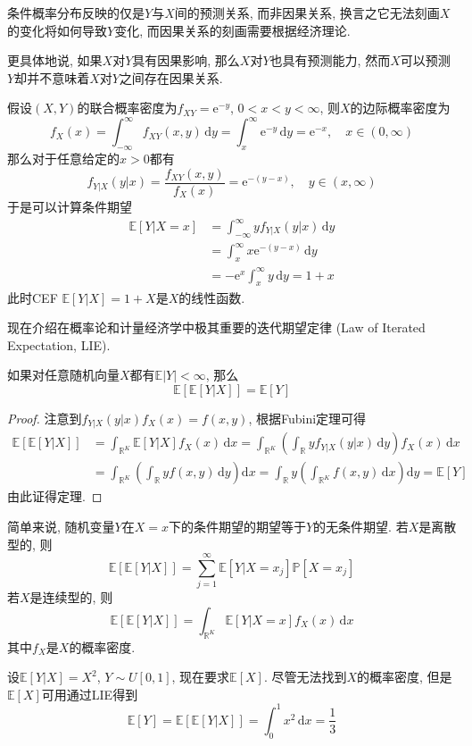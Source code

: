 \documentclass[cn, 12pt, math=mtpro2, bibstyle=apa, blue, twocol]{elegantbook}
\newcommand{\R}{\mathbb{R}}
\newcommand{\E}{\mathbb{E}}
\newcommand{\PP}{\mathbb{P}}
\begin{document}
\begin{remark}
条件概率分布反映的仅是$Y$与$X$间的预测关系, 而非因果关系, 换言之它无法刻画$X$的变化将如何导致$Y$变化, 而因果关系的刻画需要根据经济理论.

更具体地说, 如果$X$对$Y$具有因果影响, 那么$X$对$Y$也具有预测能力, 然而$X$可以预测$Y$却并不意味着$X$对$Y$之间存在因果关系.
\end{remark}
\begin{example}
假设$(X,Y)$的联合概率密度为$f_{XY}=\text{e}^{-y}$, $0<x<y<\infty$, 则$X$的边际概率密度为
$$f_X(x)=\int_{-\infty}^{\infty}f_{XY}(x,y)\,\text{d}y=\int_{x}^{\infty}\text{e}^{-y}\,\text{d}y=\text{e}^{-x},\quad x\in(0,\infty)$$
那么对于任意给定的$x>0$都有
$$f_{Y|X}(y|x)=\frac{f_{XY}(x,y)}{f_X(x)}=\text{e}^{-(y-x)},\quad y\in(x,\infty)$$
于是可以计算条件期望
\begin{align*}
\E[Y|X=x]&=\int_{-\infty}^{\infty}yf_{Y|X}(y|x)\,\text{d}y \\
&=\int_{x}^{\infty}x\text{e}^{-(y-x)}\,\text{d}y \\
&=-\text{e}^{x}\int_{x}^{\infty}y\,\text{d}y=1+x
\end{align*}
此时CEF $\E[Y|X]=1+X$是$X$的线性函数.
\end{example}
现在介绍在概率论和计量经济学中极其重要的迭代期望定律 (Law of Iterated Expectation, LIE).
\begin{theorem}[简单迭代期望定律]
  如果对任意随机向量$X$都有$\E|Y|<\infty$, 那么
  $$\E[\E[Y|X]]=\E[Y]$$
\end{theorem}
\begin{proof}
  注意到$f_{Y|X}(y|x)f_X(x)=f(x,y)$, 根据Fubini定理可得
  \begin{align*}
  \E[\E[Y|X]]&=\int_{\R^K}\E[Y|X]f_X(x)\,\text{d}x =\int_{\R^K}\left(\int_\R yf_{Y|X}(y|x)\,\text{d}y\right)f_X(x)\,\text{d}x \\
   &=\int_{\R^K}\left(\int_\R yf(x,y)\,\text{d}y\right)\text{d}x =\int_\R y\left(\int_{\R^K}f(x,y)\,\text{d}x\right)\text{d}y=\E[Y]
  \end{align*}
  由此证得定理.
\end{proof}
简单来说, 随机变量$Y$在$X=x$下的条件期望的期望等于$Y$的无条件期望. 若$X$是离散型的, 则
$$\E[\E[Y|X]]=\sum_{j=1}^{\infty}\E[Y|X=x_j]\PP[X=x_j]$$
若$X$是连续型的, 则
$$\E[\E[Y|X]]=\int_{\R^K}\E[Y|X=x]f_X(x)\,\text{d}x$$
其中$f_X$是$X$的概率密度.

\begin{example}
设$\E[Y|X]=X^2$, $Y\sim U[0,1]$, 现在要求$\E[X]$. 尽管无法找到$X$的概率密度, 但是$\E[X]$可用通过LIE得到
$$\E[Y]=\E[\E[Y|X]]=\int_{0}^{1}x^2\,\text{d}x=\frac{1}{3}$$
\end{example}
\end{document}
